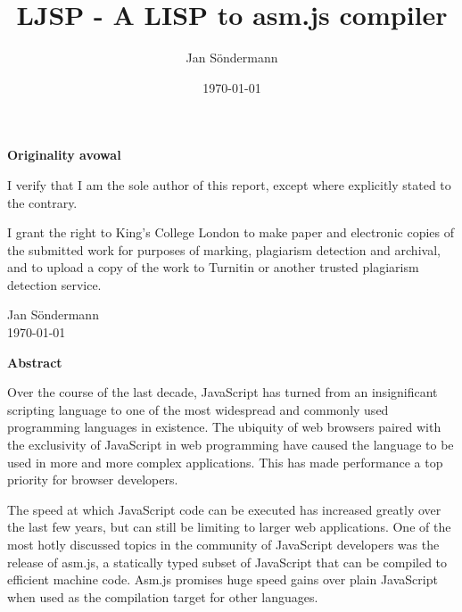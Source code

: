 \documentclass[11pt]{report}
\title{LJSP - A LISP to asm.js compiler}
\author{Jan S\"ondermann}
\date{\today}
\begin{document}

\maketitle

\begin{center}
\textbf{Originality avowal}
\end{center}

I verify that I am the sole author of this report, except where explicitly stated to the contrary.

I grant the right to King's College London to make paper and electronic copies of the submitted work for purposes of marking, plagiarism detection and archival, and to upload a copy of the work to Turnitin or another trusted plagiarism detection service.\\

\begin{flushright}
Jan Söndermann \\
\today
\end{flushright}
\newpage
			
\begin{center}
\textbf{Abstract}
\end{center}

Over the course of the last decade, JavaScript has turned from an insignificant scripting language to one of the most widespread and commonly used programming languages in existence. The ubiquity of web browsers paired with the exclusivity of JavaScript in web programming have caused the language to be used in more and more complex applications. This has made performance a top priority for browser developers.

The speed at which JavaScript code can be executed has increased greatly over the last few years, but can still be limiting to larger web applications. One of the most hotly discussed topics in the community of JavaScript developers was the release of asm.js, a statically typed subset of JavaScript that can be compiled to efficient machine code. Asm.js promises huge speed gains over plain JavaScript when used as the compilation target for other languages.
\end{document}
